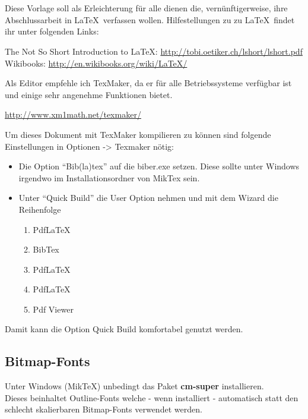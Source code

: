 \chapter*{\abstractname} %
Diese Vorlage soll als Erleichterung für alle dienen die, vernünftigerweise, ihre Abschlussarbeit in \LaTeX \ verfassen wollen. Hilfestellungen zu zu \LaTeX \ findet ihr unter folgenden Links:

\begin{center}
The Not So Short Introduction to \LaTeX: \url{http://tobi.oetiker.ch/lshort/lshort.pdf} \\
Wikibooks: \url{http://en.wikibooks.org/wiki/LaTeX/}
\end{center}

Als Editor empfehle ich TexMaker, da er für alle Betriebssysteme verfügbar ist und einige sehr angenehme Funktionen bietet.
\begin{center}\url{http://www.xm1math.net/texmaker/}\end{center}

Um dieses Dokument mit TexMaker kompilieren zu können sind folgende Einstellungen in Optionen -> Texmaker nötig:
\begin{itemize}
\item Die Option \enquote{Bib(la)tex} auf die biber.exe setzen. Diese sollte unter Windows irgendwo im Installationsordner von MikTex sein.
\item Unter \enquote{Quick Build} die User Option nehmen und mit dem Wizard die Reihenfolge
	\begin{enumerate}
	\item PdfLaTeX
	\item BibTex
	\item PdfLaTeX
	\item PdfLaTeX
	\item Pdf Viewer	
	\end{enumerate}
\end{itemize}
Damit kann die Option Quick Build komfortabel genutzt werden.\\
\section*{Bitmap-Fonts}
\noindent Unter Windows (MikTeX) unbedingt das Paket \textbf{cm-super} installieren.\\
Dieses beinhaltet Outline-Fonts welche - wenn installiert - automatisch statt den schlecht skalierbaren Bitmap-Fonts verwendet werden.
